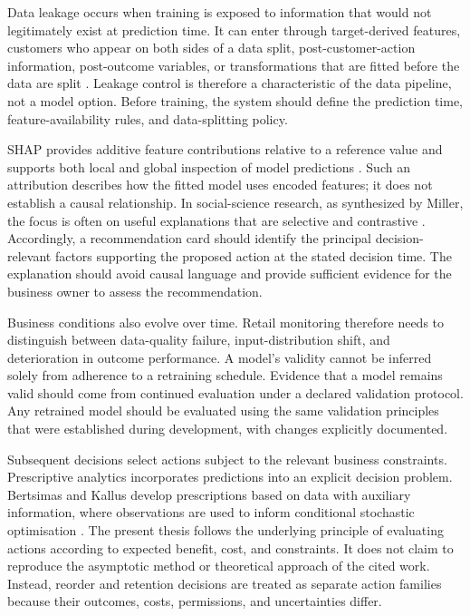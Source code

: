 \documentclass[a4paper,11pt,oneside]{book}
\theoremstyle{plain}
\theoremstyle{definition}
\theoremstyle{remark}
\begin{document}
Data leakage occurs when training is exposed to information that would not legitimately exist at prediction time. It can enter through target-derived features, customers who appear on both sides of a data split, post-customer-action information, post-outcome variables, or transformations that are fitted before the data are split \cite{kaufman2012leakage}. Leakage control is therefore a characteristic of the data pipeline, not a model option. Before training, the system should define the prediction time, feature-availability rules, and data-splitting policy.

SHAP provides additive feature contributions relative to a reference value and supports both local and global inspection of model predictions \cite{lundberg2017shap}. Such an attribution describes how the fitted model uses encoded features; it does not establish a causal relationship. In social-science research, as synthesized by Miller, the focus is often on useful explanations that are selective and contrastive \cite{miller2019explanation}. Accordingly, a recommendation card should identify the principal decision-relevant factors supporting the proposed action at the stated decision time. The explanation should avoid causal language and provide sufficient evidence for the business owner to assess the recommendation.

Business conditions also evolve over time. Retail monitoring therefore needs to distinguish between data-quality failure, input-distribution shift, and deterioration in outcome performance. A model's validity cannot be inferred solely from adherence to a retraining schedule. Evidence that a model remains valid should come from continued evaluation under a declared validation protocol. Any retrained model should be evaluated using the same validation principles that were established during development, with changes explicitly documented.

Subsequent decisions select actions subject to the relevant business constraints. Prescriptive analytics incorporates predictions into an explicit decision problem. Bertsimas and Kallus develop prescriptions based on data with auxiliary information, where observations are used to inform conditional stochastic optimisation \cite{bertsimas2020prescriptive}. The present thesis follows the underlying principle of evaluating actions according to expected benefit, cost, and constraints. It does not claim to reproduce the asymptotic method or theoretical approach of the cited work. Instead, reorder and retention decisions are treated as separate action families because their outcomes, costs, permissions, and uncertainties differ.
\end{document}
